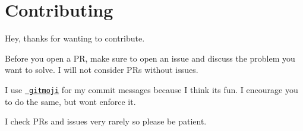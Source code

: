 \chapter{Contributing}
\hypertarget{md_node__modules_2zod-to-json-schema_2contributing}{}\label{md_node__modules_2zod-to-json-schema_2contributing}
\label{md_node__modules_2zod-to-json-schema_2contributing_autotoc_md36321}%
%


Hey, thanks for wanting to contribute.

Before you open a PR, make sure to open an issue and discuss the problem you want to solve. I will not consider PRs without issues.

I use \href{https://gitmoji.dev/}{\texttt{ gitmoji}} for my commit messages because I think it\textquotesingle{}s fun. I encourage you to do the same, but won\textquotesingle{}t enforce it.

I check PRs and issues very rarely so please be patient. 